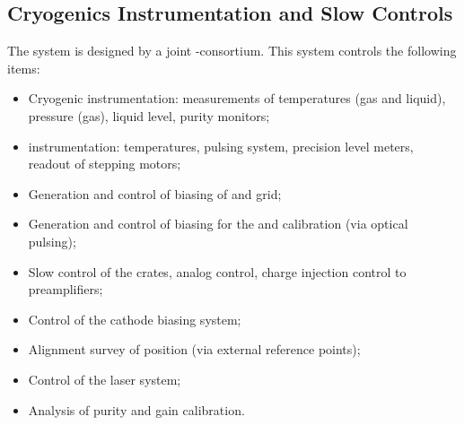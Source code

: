\subsection{Cryogenics Instrumentation and Slow Controls}
\label{sec:dp-execsum-sc}
The  system is designed by a joint \single{}-\dual consortium. 
This system controls the following items:

\begin{itemize}
\item Cryogenic instrumentation: measurements of temperatures (gas and liquid), pressure (gas), liquid level, purity monitors;
\item {} instrumentation: temperatures, pulsing system, precision level meters, readout of  stepping motors;
\item Generation and control of  biasing of  and grid;
\item Generation and control of  biasing for the  and calibration (via optical pulsing);
\item Slow control of the  crates, analog  control, charge injection control to preamplifiers;
\item Control of the cathode  biasing system;
\item Alignment survey of  position (via external reference points);
\item Control of the laser system;
\item Analysis of \lar purity and   gain calibration.
\end{itemize}

  
